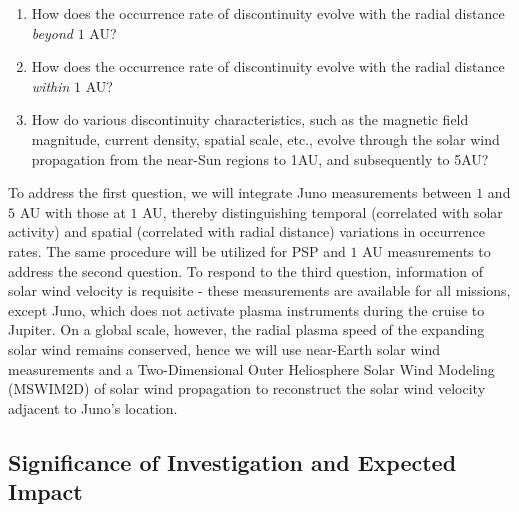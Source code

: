 \documentclass[
  letterpaper,
  DIV=11,
  numbers=noendperiod]{scrartcl}
\begin{document}
\begin{enumerate}
\def\labelenumi{\arabic{enumi}.}
\item
  How does the occurrence rate of discontinuity evolve with the radial
  distance \emph{beyond} \(1\) AU?
\item
  How does the occurrence rate of discontinuity evolve with the radial
  distance \emph{within} \(1\) AU?
\item
  How do various discontinuity characteristics, such as the magnetic
  field magnitude, current density, spatial scale, etc., evolve through
  the solar wind propagation from the near-Sun regions to 1AU, and
  subsequently to 5AU?
\end{enumerate}

To address the first question, we will integrate Juno measurements
between \(1\) and \(5\) AU with those at \(1\) AU, thereby
distinguishing temporal (correlated with solar activity) and spatial
(correlated with radial distance) variations in occurrence rates. The
same procedure will be utilized for PSP and \(1\) AU measurements to
address the second question. To respond to the third question,
information of solar wind velocity is requisite - these measurements are
available for all missions, except Juno, which does not activate plasma
instruments during the cruise to Jupiter. On a global scale, however,
the radial plasma speed of the expanding solar wind remains conserved,
hence we will use near-Earth solar wind measurements and a
Two-Dimensional Outer Heliosphere Solar Wind Modeling (MSWIM2D) of solar
wind propagation to reconstruct the solar wind velocity adjacent to
Juno's location.

\subsection{Significance of Investigation and Expected
Impact}\label{significance-of-investigation-and-expected-impact}
\end{document}
